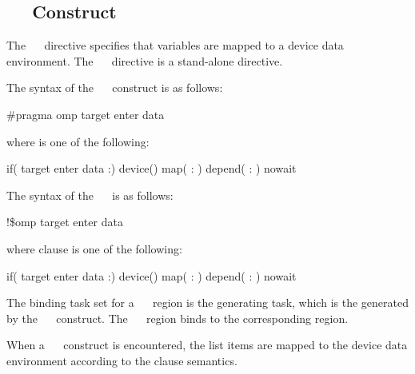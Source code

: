 \subsection{~~ Construct}
\label{subsec:target enter data Construct}
\summary
The ~~ directive specifies that variables are mapped to a device data environment. The ~~ directive is a stand-alone directive.
\syntax
\begin{ccppspecific}
The syntax of the ~~ construct is as follows:
\begin{boxedcode}
\#pragma omp target enter data 
\end{boxedcode}
where  is one of the following:
\begin{indentedcodelist}
if(\plc{[} target enter data :\plc{] scalar-expression})
device()
map(\plc{[ [map-type-modifier[,]] map-type} : \plc{] list})
depend( : )
nowait
\end{indentedcodelist}
\end{ccppspecific}
\begin{fortranspecific}
The syntax of the ~~ is as follows:
\begin{boxedcode}
!\$omp target enter data 
\end{boxedcode}
where clause is one of the following:
\begin{indentedcodelist}
if(\plc{[} target enter data :\plc{] scalar-logical-expression})
device()
map(\plc{[ [map-type-modifier[,]] map-type} : \plc{] list})
depend( : )
nowait
\end{indentedcodelist}
\end{fortranspecific}

\binding
The binding task set for a ~~ region is
the generating task, which is the  generated by the
~~ construct. The
~~ region binds to the corresponding
 region.

\descr
When a ~~ construct is encountered, the list items are mapped to the device data environment according to the  clause semantics.

